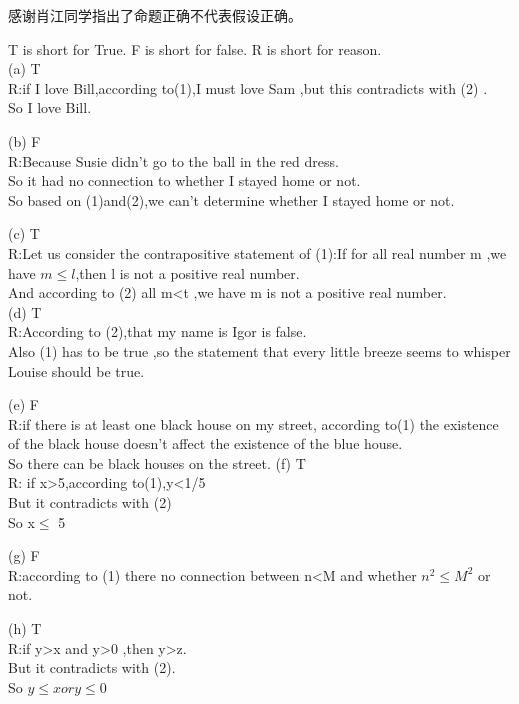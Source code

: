 \documentclass[11pt, a4paper, UTF8]{ctexart}
\begin{document}
\begin{remark}
感谢肖江同学指出了命题正确不代表假设正确。
\end{remark}

\begin{solution}
T is short for True. F is short for false. R is short for reason.\\
(a) T\\
    R:if I love Bill,according to(1),I must love Sam ,but this contradicts with (2) .\\
    So I love Bill.


(b) F\\
    R:Because Susie didn't go to the ball in the red dress.\\
    So it had no connection to whether I stayed home or not.\\
    So based on (1)and(2),we can't determine whether I stayed home or not.

(c) T\\
    R:Let us consider the contrapositive statement of (1):If for all real number m ,we have $m \le l$,then l is not a positive real number.\\
    And according to (2) all m<t ,we have m is not a positive real number.\\

(d) T\\
    R:According to (2),that my name is Igor is false.\\
    Also (1) has to be true ,so the statement that every little breeze seems to whisper Louise should be true.

(e) F\\
    R:if there is at least one black house on my street, according to(1) the existence of the black house doesn't affect the existence of the blue house.\\
    So there can be black houses on the street.
(f) T\\
    R: if x>5,according to(1),y<1/5\\
    But it contradicts with (2)\\
    So x$\le$ 5

(g) F\\
    R:according to (1) there no connection between n<M and whether $n^ 2 \le M^2$ or not.

(h) T\\
    R:if y>x and y>0 ,then y>z.\\
    But it contradicts with (2).\\
    So $y \le x  or  y\le 0  $

\end{solution}
\end{document}
